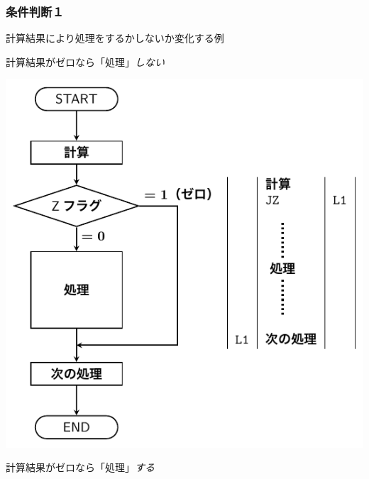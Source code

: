 \documentclass[handout]{beamer}        %
\begin{document}
\begin{frame}
  \frametitle{条件判断１}
  計算結果により処理をするかしないか変化する例
  \vfill
  \begin{minipage}{0.49\columnwidth}
    \begin{itembox}[l]{\footnotesize 計算結果がゼロなら「処理」\emph{しない}}
      \centerline{\includegraphics[scale=0.6]{../Tikz/flow2AB.pdf}}
    \end{itembox}
  \end{minipage}
  \begin{minipage}{0.5\columnwidth}
    \begin{itembox}[l]{\footnotesize 計算結果がゼロなら「処理」\emph{する}}

\end{itembox}
\end{minipage}
\end{frame}
\end{document}
